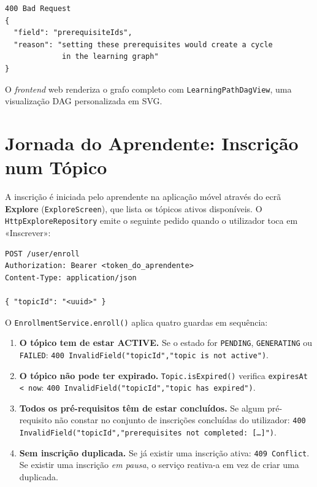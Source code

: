 \begin{verbatim}
400 Bad Request
{
  "field": "prerequisiteIds",
  "reason": "setting these prerequisites would create a cycle
             in the learning graph"
}
\end{verbatim}

O \textit{frontend} web renderiza o grafo completo com
\texttt{LearningPathDagView}, uma visualização DAG personalizada em SVG.

\section{Jornada do Aprendente: Inscrição num Tópico}
\label{sec:inscricao_deepdive}

A inscrição é iniciada pelo aprendente na aplicação móvel através do ecrã
\textbf{Explore} (\texttt{ExploreScreen}), que lista os tópicos ativos
disponíveis.
O \texttt{HttpExploreRepository} emite o seguinte pedido quando o utilizador
toca em «Inscrever»:

\begin{verbatim}
POST /user/enroll
Authorization: Bearer <token_do_aprendente>
Content-Type: application/json

{ "topicId": "<uuid>" }
\end{verbatim}

O \texttt{EnrollmentService.enroll()} aplica quatro guardas em sequência:

\begin{enumerate}
  \item \textbf{O tópico tem de estar ACTIVE.}
    Se o estado for \texttt{PENDING}, \texttt{GENERATING} ou \texttt{FAILED}:
    \texttt{400 InvalidField("topicId","topic is not active")}.

  \item \textbf{O tópico não pode ter expirado.}
    \texttt{Topic.isExpired()} verifica \texttt{expiresAt < now}:
    \texttt{400 InvalidField("topicId","topic has expired")}.

  \item \textbf{Todos os pré-requisitos têm de estar concluídos.}
    Se algum pré-requisito não constar no conjunto de inscrições concluídas
    do utilizador:
    \texttt{400 InvalidField("topicId","prerequisites not completed: [\ldots]")}.

  \item \textbf{Sem inscrição duplicada.}
    Se já existir uma inscrição ativa: \texttt{409 Conflict}.
    Se existir uma inscrição \emph{em pausa}, o serviço reativa-a em vez
    de criar uma duplicada.
\end{enumerate}

